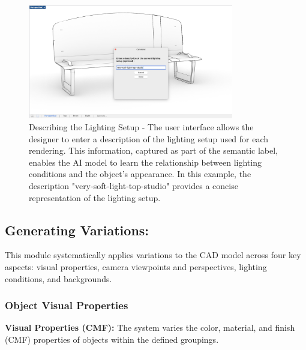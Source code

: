 \documentclass[12pt]{report}
\begin{document}
\begin{figure}[h]
    \centering
    \includegraphics[width=0.8\textwidth]{figures/figure-process-light-description-monochrome.jpg}
    \caption{Describing the Lighting Setup - The user interface allows the designer to enter a description of the lighting setup used for each rendering. This information, captured as part of the semantic label, enables the AI model to learn the relationship between lighting conditions and the object's appearance. In this example, the description "very-soft-light-top-studio" provides a concise representation of the lighting setup.}
    \label{fig:lighting_description_input}
\end{figure}


\subsection{Generating Variations:} This module systematically applies variations to the CAD model across four key aspects: visual properties, camera viewpoints and perspectives, lighting conditions, and backgrounds.

\subsubsection{Object Visual Properties}

\textbf{Visual Properties (CMF):} The system varies the color, material, and finish (CMF) properties of objects within the defined groupings.
\end{document}
